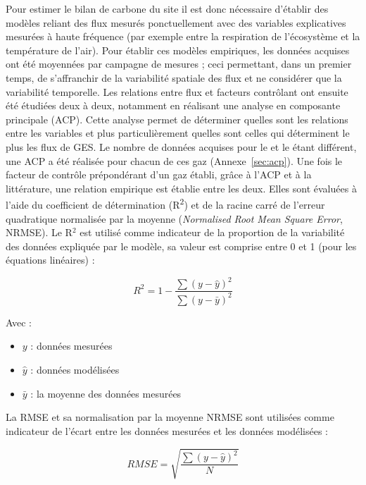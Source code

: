Pour estimer le bilan de carbone du site il est donc nécessaire d'établir des modèles reliant des flux mesurés ponctuellement avec des variables explicatives mesurées à haute fréquence (par exemple entre la respiration de l'écosystème et la température de l'air).
Pour établir ces modèles empiriques, les données acquises ont été moyennées par campagne de mesures ; ceci permettant, dans un premier temps, de s'affranchir de la variabilité spatiale des flux et ne considérer que la variabilité temporelle.
Les relations entre flux et facteurs contrôlant ont ensuite été étudiées deux à deux, notamment en réalisant une analyse en composante principale (ACP).
Cette analyse permet de déterminer quelles sont les relations entre les variables et plus particulièrement quelles sont celles qui déterminent le plus les flux de GES.
Le nombre de données acquises pour le \coo et le \chh étant différent, une ACP a été réalisée pour chacun de ces gaz (Annexe~\ref{sec:acp}).
Une fois le facteur de contrôle prépondérant d'un gaz établi, grâce à l'ACP et à la littérature, une relation empirique est établie entre les deux.
Elles sont évaluées à l'aide du coefficient de détermination (R\textsuperscript{2}) et de la racine carré de l'erreur quadratique normalisée par la moyenne (\textit{Normalised Root Mean Square Error}, NRMSE).
Le R$^{2}$ est utilisé comme indicateur de la proportion de la variabilité des données expliquée par le modèle, sa valeur est comprise entre 0 et 1 (pour les équations linéaires) : 

$$ R^{2} = 1 - \frac{\sum(y-\hat{y})^2}{\sum(y-\bar{y})^2} $$ 

Avec : 
\begin{itemize}
\item $y$ : données mesurées
\item $\hat{y}$ : données modélisées
\item $\bar{y}$ : la moyenne des données mesurées
\end{itemize}

La RMSE et sa normalisation par la moyenne NRMSE sont utilisées comme indicateur de l'écart entre les données mesurées et les données modélisées :

$$ RMSE = \sqrt{\frac{\sum(y - \hat{y})^2}{N}} $$

